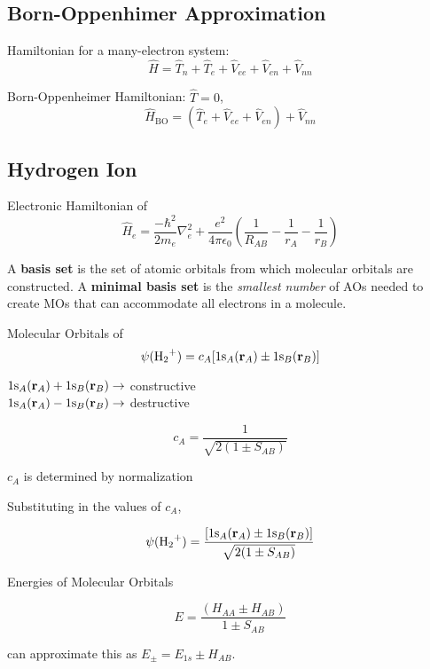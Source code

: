 \subsection*{Born-Oppenhimer Approximation}

Hamiltonian for a many-electron system:
$$\hat{H} = \hat{T}_{n} + \hat{T}_{e} + \hat{V}_{ee} + \hat{V}_{en} + \hat{V}_{nn}$$

Born-Oppenheimer Hamiltonian: $\hat{T} = 0$,
$$\hat{H}_{\mathrm{BO}} = \left( \hat{T}_{e} + \hat{V}_{ee} + \hat{V}_{en} \right) + \hat{V}_{nn}$$

\subsection*{Hydrogen Ion }

Electronic Hamiltonian of 
\begin{equation*}
    \hat{H}_e = \frac{-\hbar^2}{2m_e}\nabla^2_e + \frac{e^2}{4\pi\epsilon_0} \left( \frac{1}{R_{AB}} - \frac{1}{r_{A}} - \frac{1}{r_{B}} \right)
\end{equation*}

A \textbf{basis set} is the set of atomic orbitals from which molecular orbitals are constructed. A
\textbf{minimal basis set} is the \textit{smallest number} of AOs needed to create MOs that can
accommodate all electrons in a molecule.
\vspace{\baselineskip}

Molecular Orbitals of 
\begin{equation*}
    \psi(\ce{H2+}) = c_A[1\ce{s_}_A (\mathbf{r}_A) \pm 1\ce{s_}_B (\mathbf{r}_B)]
  \end{equation*}

$1\ce{s_}_A (\mathbf{r}_A) + 1\ce{s_}_B (\mathbf{r}_B) \rightarrow$ constructive \\
$1\ce{s_}_A (\mathbf{r}_A) - 1\ce{s_}_B (\mathbf{r}_B) \rightarrow$ destructive 

$$c_A = \frac{1}{\sqrt{2 (1 \pm S_{AB})}}$$

$c_A$ is determined by normalization

Substituting in the values of $c_A$,

$$\psi(\ce{H2+}) = \frac{[1\ce{s_}_A (\mathbf{r}_A) \pm 1\ce{s_}_B (\mathbf{r}_B)]}{\sqrt{2 (1 \pm S_{AB})}}$$

Energies of  Molecular Orbitals

$$E = \frac{(H_{AA} \pm H_{AB})}{1 \pm S_{AB}}$$

can approximate this as $E_{\pm} = E_{1s} \pm H_{AB}$.

